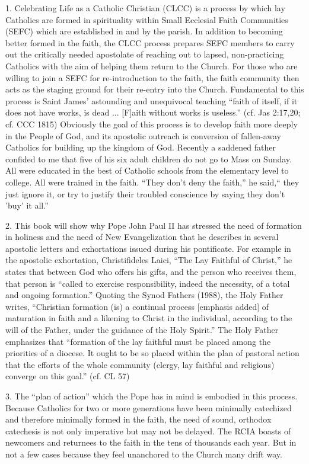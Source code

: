 \documentclass[oneside]{book}
\begin{document}
1. Celebrating Life as a Catholic Christian (CLCC) is a process by which lay
Catholics are formed in spirituality within Small Ecclesial Faith Communities
(SEFC) which are established in and by the parish. In addition to becoming
better formed in the faith, the CLCC process prepares SEFC members to carry out
the critically needed apostolate of reaching out to lapsed, non-practicing
Catholics with the aim of helping them return to the Church. For those who are
willing to join a SEFC for re-introduction to the faith, the faith community
then acts as the staging ground for their re-entry into the Church. Fundamental
to this process is Saint James' astounding and unequivocal teaching ``faith of
itself, if it does not have works, is dead ... [F]aith without works is
useless.'' (cf. Jas 2:17,20; cf. CCC 1815) Obviously the goal of this process is
to develop faith more deeply in the People of God, and its apostolic outreach is
conversion of fallen-away Catholics for building up the kingdom of God.
Recently a saddened father confided to me that five of his six adult children do
not go to Mass on Sunday. All were educated in the best of Catholic schools from
the elementary level to college. All were trained in the faith. ``They don't
deny the faith,'' he said,`` they just ignore it, or try to justify their
troubled conscience by saying they don't 'buy' it all.''

2. This book will show why Pope John Paul II has stressed the need of formation
in holiness and the need of New Evangelization that he describes in several
apostolic letters and exhortations issued during his pontificate. For example in
the apostolic exhortation, Christifideles Laici, ``The Lay Faithful of Christ,''
he states that between God who offers his gifts, and the person who receives
them, that person is ``called to exercise responsibility, indeed the necessity,
of a total and ongoing formation.'' Quoting the Synod Fathers (1988), the Holy
Father writes, ``Christian formation (is) a continual process [emphasis added]
of maturation in faith and a likening to Christ in the individual, according to
the will of the Father, under the guidance of the Holy Spirit.'' The Holy Father
emphasizes that ``formation of the lay faithful must be placed among the
priorities of a diocese. It ought to be so placed within the plan of pastoral
action that the efforts of the whole community (clergy, lay faithful and
religious) converge on this goal.'' (cf. CL 57)

3. The ``plan of action'' which the Pope has in mind is embodied in this
process. Because Catholics for two or more generations have been minimally
catechized and therefore minimally formed in the faith, the need of sound,
orthodox catechesis is not only imperative but may not be delayed. The RCIA
boasts of newcomers and returnees to the faith in the tens of thousands each
year. But in not a few cases because they feel unanchored to the Church many
drift way.
\end{document}

